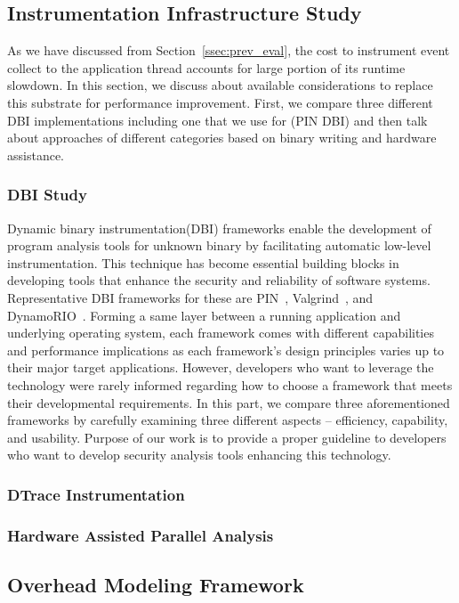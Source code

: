 \subsection{Instrumentation Infrastructure Study}

As we have discussed from Section~\ref{ssec:prev_eval}, the cost to instrument
event collect to the application thread accounts for large portion of its
runtime slowdown. In this section, we discuss about available considerations to
replace this substrate for performance improvement. First, we compare three
different DBI implementations including one that we use for \sreplica (PIN DBI)
and then talk about approaches of different categories based on binary writing
and hardware assistance.

\subsubsection{DBI Study} 

Dynamic binary instrumentation(DBI) frameworks enable the development of
program analysis tools for unknown binary by facilitating automatic low-level
instrumentation. This technique has become essential building blocks in
developing tools that enhance the security and reliability of software systems.
Representative DBI frameworks for these are PIN~\cite{}, Valgrind~\cite{}, and
DynamoRIO~\cite{}.
%
Forming a same layer between a running application and underlying operating
system, each framework comes with different capabilities and performance
implications as each framework’s design principles varies up to their major
target applications. However, developers who want to leverage the technology
were rarely informed regarding how to choose a framework that meets their
developmental requirements.
%
In this part, we compare three aforementioned frameworks by carefully examining
three different aspects – efficiency, capability, and usability. Purpose of our
work is to provide a proper guideline to developers who want to develop
security analysis tools enhancing this technology.

\subsubsection{DTrace Instrumentation}


\subsubsection{Hardware Assisted Parallel Analysis}
\subsection{Overhead Modeling Framework}
